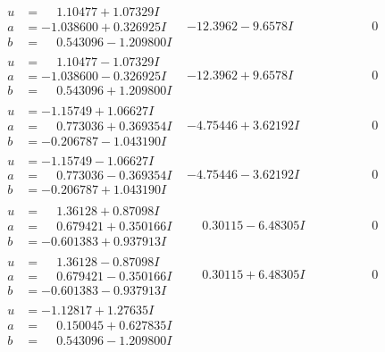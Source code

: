 \documentclass[1p]{elsarticle_modified}
\theoremstyle{definition}
\begin{document}
$$\begin{array}{c|c|c}
\begin{aligned}
u &= \phantom{-}1.10477 + 1.07329 I \\
a &= -1.038600 + 0.326925 I \\
b &= \phantom{-}0.543096 - 1.209800 I\end{aligned}
 & -12.3962 - 9.6578 I & \phantom{-0.000000 } 0 \\ \hline\begin{aligned}
u &= \phantom{-}1.10477 - 1.07329 I \\
a &= -1.038600 - 0.326925 I \\
b &= \phantom{-}0.543096 + 1.209800 I\end{aligned}
 & -12.3962 + 9.6578 I & \phantom{-0.000000 } 0 \\ \hline\begin{aligned}
u &= -1.15749 + 1.06627 I \\
a &= \phantom{-}0.773036 + 0.369354 I \\
b &= -0.206787 - 1.043190 I\end{aligned}
 & -4.75446 + 3.62192 I & \phantom{-0.000000 } 0 \\ \hline\begin{aligned}
u &= -1.15749 - 1.06627 I \\
a &= \phantom{-}0.773036 - 0.369354 I \\
b &= -0.206787 + 1.043190 I\end{aligned}
 & -4.75446 - 3.62192 I & \phantom{-0.000000 } 0 \\ \hline\begin{aligned}
u &= \phantom{-}1.36128 + 0.87098 I \\
a &= \phantom{-}0.679421 + 0.350166 I \\
b &= -0.601383 + 0.937913 I\end{aligned}
 & \phantom{-}0.30115 - 6.48305 I & \phantom{-0.000000 } 0 \\ \hline\begin{aligned}
u &= \phantom{-}1.36128 - 0.87098 I \\
a &= \phantom{-}0.679421 - 0.350166 I \\
b &= -0.601383 - 0.937913 I\end{aligned}
 & \phantom{-}0.30115 + 6.48305 I & \phantom{-0.000000 } 0 \\ \hline\begin{aligned}
u &= -1.12817 + 1.27635 I \\
a &= \phantom{-}0.150045 + 0.627835 I \\
b &= \phantom{-}0.543096 - 1.209800 I\end{aligned}

\end{array}$$
\end{document}
